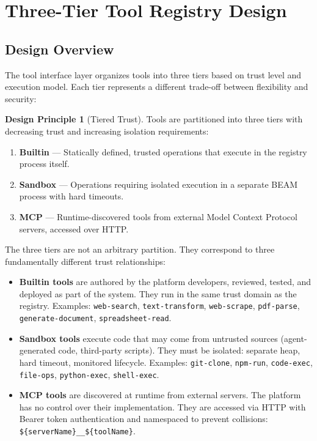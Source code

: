 \documentclass[12pt,a4paper]{article}
\theoremstyle{plain}
\theoremstyle{definition}
\newtheorem{designprinciple}[theorem]{Design Principle}
\begin{document}
\section{Three-Tier Tool Registry Design}
\label{sec:design}

\subsection{Design Overview}

The tool interface layer organizes tools into three tiers based on trust level and execution model. Each tier represents a different trade-off between flexibility and security:

\begin{designprinciple}[Tiered Trust]
\label{dp:tiers}
Tools are partitioned into three tiers with decreasing trust and increasing isolation requirements:
\begin{enumerate}
\item \textbf{Builtin} --- Statically defined, trusted operations that execute in the registry process itself.
\item \textbf{Sandbox} --- Operations requiring isolated execution in a separate BEAM process with hard timeouts.
\item \textbf{MCP} --- Runtime-discovered tools from external Model Context Protocol servers, accessed over HTTP.
\end{enumerate}
\end{designprinciple}

The three tiers are not an arbitrary partition. They correspond to three fundamentally different trust relationships:

\begin{itemize}[leftmargin=2em]
\item \textbf{Builtin tools} are authored by the platform developers, reviewed, tested, and deployed as part of the system. They run in the same trust domain as the registry. Examples: \texttt{web-search}, \texttt{text-transform}, \texttt{web-scrape}, \texttt{pdf-parse}, \texttt{generate-document}, \texttt{spreadsheet-read}.

\item \textbf{Sandbox tools} execute code that may come from untrusted sources (agent-generated code, third-party scripts). They must be isolated: separate heap, hard timeout, monitored lifecycle. Examples: \texttt{git-clone}, \texttt{npm-run}, \texttt{code-exec}, \texttt{file-ops}, \texttt{python-exec}, \texttt{shell-exec}.

\item \textbf{MCP tools} are discovered at runtime from external servers. The platform has no control over their implementation. They are accessed via HTTP with Bearer token authentication and namespaced to prevent collisions: \texttt{\$\{serverName\}\_\_\$\{toolName\}}.
\end{itemize}
\end{document}
